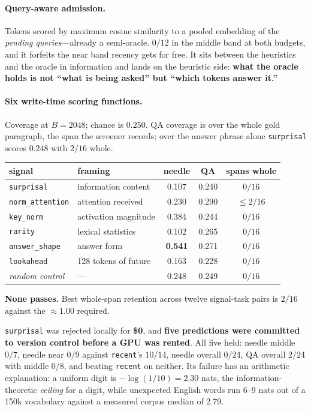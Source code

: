 \documentclass[10pt]{article}
\begin{document}
\paragraph{Query-aware admission.} Tokens scored by maximum cosine similarity
to a pooled embedding of the \emph{pending queries}---already a semi-oracle.
$0/12$ in the middle band at both budgets, and it forfeits the near band
recency gets for free. It sits between the heuristics and the oracle in
information and lands on the heuristic side: \textbf{what the oracle holds is
not ``what is being asked'' but ``which tokens answer it.''}

\paragraph{Six write-time scoring functions.} Coverage at $B{=}2048$; chance is
$0.250$. QA coverage is over the whole gold paragraph, the span the screener
records; over the answer phrase alone \texttt{surprisal} scores $0.248$ with
$2/16$ whole.

\begin{table}[h]\centering\small
\begin{tabular}{llccc}
\toprule
signal & framing & needle & QA & spans whole \\
\midrule
\texttt{surprisal} & information content & 0.107 & 0.240 & $0/16$ \\
\texttt{norm\_attention} & attention received & 0.230 & 0.290 & $\le 2/16$ \\
\texttt{key\_norm} & activation magnitude & 0.384 & 0.244 & $0/16$ \\
\texttt{rarity} & lexical statistics & 0.102 & 0.265 & $0/16$ \\
\texttt{answer\_shape} & answer form & \textbf{0.541} & 0.271 & $0/16$ \\
\texttt{lookahead} & 128 tokens of future & 0.163 & 0.228 & $0/16$ \\
\emph{random control} & --- & 0.248 & 0.249 & $0/16$ \\
\bottomrule
\end{tabular}
\end{table}

\textbf{None passes.} Best whole-span retention across twelve signal-task
pairs is $2/16$ against the ${\approx}1.00$ required.

\texttt{surprisal} was rejected locally for \textbf{\$0}, and
\textbf{five predictions were committed to version control before a GPU was
rented}. All five held: needle middle $0/7$, needle near $0/9$ against
\texttt{recent}'s $10/14$, needle overall $0/24$, QA overall $2/24$ with middle
$0/8$, and beating \texttt{recent} on neither. Its failure has an arithmetic
explanation: a uniform digit is $-\log(1/10) = 2.30$ nats, the
information-theoretic \emph{ceiling} for a digit, while unexpected English
words run 6--9 nats out of a 150k vocabulary against a measured corpus median
of 2.79.
\end{document}
